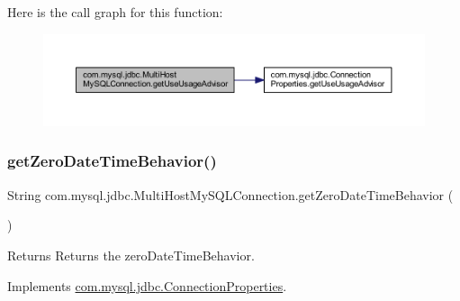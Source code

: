 Here is the call graph for this function\+:
\nopagebreak
\begin{figure}[H]
\begin{center}
\leavevmode
\includegraphics[width=350pt]{classcom_1_1mysql_1_1jdbc_1_1_multi_host_my_s_q_l_connection_a713344936008f7ef2eefecaec2aa5754_cgraph}
\end{center}
\end{figure}
\mbox{\label{classcom_1_1mysql_1_1jdbc_1_1_multi_host_my_s_q_l_connection_a7f3732fae7bbb72f1fdccbe5fe5931bd}} 
\subsubsection{\texorpdfstring{get\+Zero\+Date\+Time\+Behavior()}{getZeroDateTimeBehavior()}}
{\footnotesize\ttfamily String com.\+mysql.\+jdbc.\+Multi\+Host\+My\+S\+Q\+L\+Connection.\+get\+Zero\+Date\+Time\+Behavior (\begin{DoxyParamCaption}{ }\end{DoxyParamCaption})}

\begin{DoxyReturn}{Returns}
Returns the zero\+Date\+Time\+Behavior. 
\end{DoxyReturn}


Implements \mbox{\hyperlink{interfacecom_1_1mysql_1_1jdbc_1_1_connection_properties_a1101064e308d3d8aabe9560851a5d6b6}{com.\+mysql.\+jdbc.\+Connection\+Properties}}.

